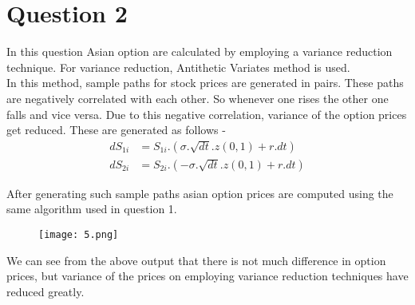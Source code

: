 \documentclass[12pt]{article}
\begin{document}
\section*{Question 2}
In this question Asian option are calculated by employing a variance reduction technique. For variance reduction, Antithetic Variates method is used. \\
In this method, sample paths for stock prices are generated in pairs.
These paths are negatively correlated with each other. So whenever one rises the other one falls and vice versa. Due to this negative correlation, variance of the option prices get reduced. 
These are generated as follows - 
\begin{align*}
dS_{1i} &= S_{1i}.(\sigma. \sqrt{dt}. z(0,1) + r.dt)\\
dS_{2i} &= S_{2i}.(-\sigma. \sqrt{dt}. z(0,1) + r.dt)
\end{align*}

After generating such sample paths asian option prices are computed using the same algorithm used in question 1.
\begin{figure}[H]
\centering
\texttt{[image: 5.png]}
\end{figure}
We can see from the above output that there is not much difference in option prices, but variance of the prices on employing variance reduction techniques have reduced greatly. 
\end{document}
